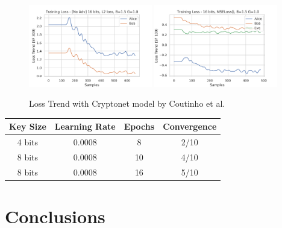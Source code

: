 \documentclass[a4paper]{article}
\begin{document}
  \begin{figure}[H]
    \centering
    \includegraphics[width=0.48\textwidth]{../../models/cryptonet/graphs/loss_1E64x256v13.png}
    \includegraphics[width=0.48\textwidth]{../../models/cryptonet/graphs/loss_1E64x256v19.png}
    \caption{Loss Trend with Cryptonet model by Coutinho et al.}
    \label{fig:res_crnet}
  \end{figure}

  \begin{center}
    \begin{tabular}{ c c c c }
      \hline
      \textbf{Key Size} & \textbf{Learning Rate} & \textbf{Epochs} & \textbf{Convergence} \\ \hline
      4 bits            & 0.0008                 & 8               & 2/10                 \\
      8 bits            & 0.0008                 & 10              & 4/10                 \\
      8 bits            & 0.0008                 & 16              & 5/10                 \\
      \hline
    \end{tabular}
  \end{center}
  
  \section{Conclusions}

  
  
\end{document}

